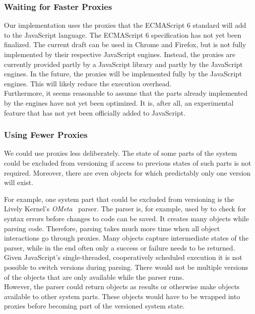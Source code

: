 \subsubsection{Waiting for Faster Proxies}

Our implementation uses the proxies that the ECMAScript 6 standard will add to the JavaScript language.
The ECMAScript 6 specification has not yet been finalized.
The current draft can be used in Chrome and Firefox, but is not fully implemented by their respective JavaScript engines.
Instead, the proxies are currently provided partly by a JavaScript library and partly by the JavaScript engines.
In the future, the proxies will be implemented fully by the JavaScript engines.
This will likely reduce the execution overhead.\\
Furthermore, it seems reasonable to assume that the parts already implemented by the engines have not yet been optimized. 
It is, after all, an experimental feature that has not yet been officially added to JavaScript.

\subsubsection{Using Fewer Proxies}

We could use proxies less deliberately.
The state of some parts of the system could be excluded from versioning if access to previous states of such parts is not required.
Moreover, there are even objects for which predictably only one version will exist.

For example, one system part that could be excluded from versioning is the Lively Kernel's \emph{OMeta}~\cite{Warth2007OOL} parser.
The parser is, for example, used by to check for syntax errors before changes to code can be saved.
It creates many objects while parsing code.
Therefore, parsing takes much more time when all object interactions go through proxies.
Many objects capture intermediate states of the parser, while in the end often only a success or failure needs to be returned.
Given JavaScript's single-threaded, cooperatively scheduled execution it is not possible to switch versions during parsing.
There would not be multiple versions of the objects that are only available while the parser runs.\\
However, the parser could return objects as results or otherwise make objects available to other system parts.
These objects would have to be wrapped into proxies before becoming part of the versioned system state.

